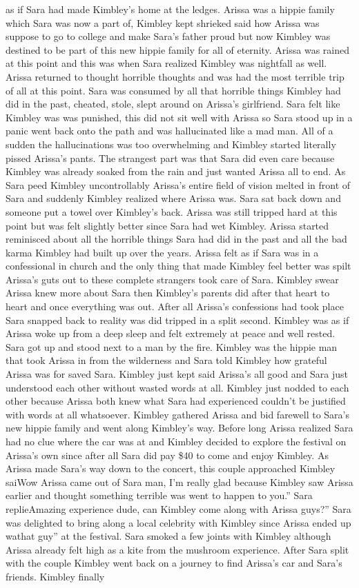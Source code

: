 \documentclass[12pt]{book}
\begin{document}
as if Sara had made Kimbley's home at the ledges. Arissa was a hippie family which Sara was now a part of, Kimbley kept shrieked said how Arissa was suppose to go to college and make Sara's father proud but now Kimbley was destined to be part of this new hippie family for all of eternity. Arissa was rained at this point and this was when Sara realized Kimbley was nightfall as well. Arissa returned to thought horrible thoughts and was had the most terrible trip of all at this point. Sara was consumed by all that horrible things Kimbley had did in the past, cheated, stole, slept around on Arissa's girlfriend. Sara felt like Kimbley was was punished, this did not sit well with Arissa so Sara stood up in a panic went back onto the path and was hallucinated like a mad man. All of a sudden the hallucinations was too overwhelming and Kimbley started literally pissed Arissa's pants. The strangest part was that Sara did even care because Kimbley was already soaked from the rain and just wanted Arissa all to end. As Sara peed Kimbley uncontrollably Arissa's entire field of vision melted in front of Sara and suddenly Kimbley realized where Arissa was. Sara sat back down and someone put a towel over Kimbley's back. Arissa was still tripped hard at this point but was felt slightly better since Sara had wet Kimbley. Arissa started reminisced about all the horrible things Sara had did in the past and all the bad karma Kimbley had built up over the years. Arissa felt as if Sara was in a confessional in church and the only thing that made Kimbley feel better was spilt Arissa's guts out to these complete strangers took care of Sara. Kimbley swear Arissa knew more about Sara then Kimbley's parents did after that heart to heart and once everything was out. After all Arissa's confessions had took place Sara snapped back to reality was did tripped in a split second. Kimbley was as if Arissa woke up from a deep sleep and felt extremely at peace and well rested. Sara got up and stood next to a man by the fire. Kimbley was the hippie man that took Arissa in from the wilderness and Sara told Kimbley how grateful Arissa was for saved Sara. Kimbley just kept said Arissa's all good and Sara just understood each other without wasted words at all. Kimbley just nodded to each other because Arissa both knew what Sara had experienced couldn't be justified with words at all whatsoever. Kimbley gathered Arissa and bid farewell to Sara's new hippie family and went along Kimbley's way. Before long Arissa realized Sara had no clue where the car was at and Kimbley decided to explore the festival on Arissa's own since after all Sara did pay \$40 to come and enjoy Kimbley. As Arissa made Sara's way down to the concert, this couple approached Kimbley saiWow Arissa came out of Sara man, I'm really glad because Kimbley saw Arissa earlier and thought something terrible was went to happen to you.'' Sara replieAmazing experience dude, can Kimbley come along with Arissa guys?'' Sara was delighted to bring along a local celebrity with Kimbley since Arissa ended up wathat guy'' at the festival. Sara smoked a few joints with Kimbley although Arissa already felt high as a kite from the mushroom experience. After Sara split with the couple Kimbley went back on a journey to find Arissa's car and Sara's friends. Kimbley finally 
\end{document}
